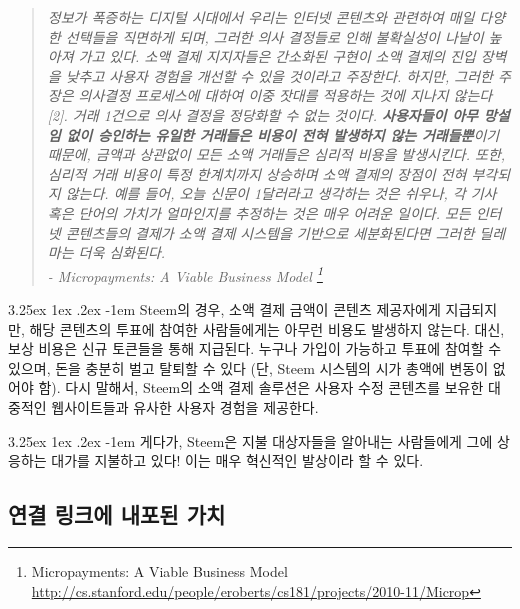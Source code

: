 \documentclass{article}
\makeatletter
\renewcommand\paragraph{\@startsection{paragraph}{5}{\z@}%
  {3.25ex \@plus1ex \@minus.2ex}%
  {-1em}%
  {\normalfont\normalsize\bfseries}}
\makeatother
\begin{document}
            \begin{quote}
                    \textit{정보가 폭증하는 디지털 시대에서 우리는 인터넷 콘텐츠와 관련하여 매일 다양한 선택들을 직면하게 되며, 그러한 의사 결정들로 인해 불확실성이 나날이 높아져 가고 있다. 소액 결제 지지자들은 간소화된 구현이 소액 결제의 진입 장벽을 낮추고 사용자 경험을 개선할 수 있을 것이라고 주장한다. 하지만, 그러한 주장은 의사결정 프로세스에 대하여 이중 잣대를 적용하는 것에 지나지 않는다 [2]. 거래 1건으로 의사 결정을 정당화할 수 없는 것이다. \textbf{사용자들이 아무 망설임 없이 승인하는 유일한 거래들은 비용이 전혀 발생하지 않는 거래들뿐}이기 때문에, 금액과 상관없이 모든 소액 거래들은 심리적 비용을 발생시킨다. 또한, 심리적 거래 비용이 특정 한계치까지 상승하며 소액 결제의 장점이 전혀 부각되지 않는다. 예를 들어, 오늘 신문이 1달러라고 생각하는 것은 쉬우나, 각 기사 혹은 단어의 가치가 얼마인지를 추정하는 것은 매우 어려운 일이다. 모든 인터넷 콘텐츠들의 결제가 소액 결제 시스템을 기반으로 세분화된다면 그러한 딜레마는 더욱 심화된다.}\\

                    \textit{- Micropayments: A Viable Business Model
\footnote{Micropayments: A Viable Business Model\newline
\url{http://cs.stanford.edu/people/eroberts/cs181/projects/2010-11/Microp}}}
            \end{quote}

            \paragraph{}
                Steem의 경우, 소액 결제 금액이 콘텐츠 제공자에게 지급되지만, 해당 콘텐츠의 투표에 참여한 사람들에게는 아무런 비용도 발생하지 않는다. 대신, 보상 비용은 신규 토큰들을 통해 지급된다. 누구나 가입이 가능하고 투표에 참여할 수 있으며, 돈을 충분히 벌고 탈퇴할 수 있다 (단, Steem 시스템의 시가 총액에 변동이 없어야 함). 다시 말해서, Steem의 소액 결제 솔루션은 사용자 수정 콘텐츠를 보유한 대중적인 웹사이트들과 유사한 사용자 경험을 제공한다.

            \paragraph{}
                게다가, Steem은 지불 대상자들을 알아내는 사람들에게 그에 상응하는 대가를 지불하고 있다! 이는 매우 혁신적인 발상이라 할 수 있다.

        \subsection{연결 링크에 내포된 가치}
\end{document}
